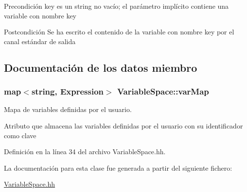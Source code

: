\begin{DoxyPrecond}{Precondición}
\textquotesingle{}key\textquotesingle{} es un string no vacío; el parámetro implícito contiene una variable con nombre \textquotesingle{}key\textquotesingle{} 
\end{DoxyPrecond}
\begin{DoxyPostcond}{Postcondición}
Se ha escrito el contenido de la variable con nombre \textquotesingle{}key\textquotesingle{} por el canal estándar de salida 
\end{DoxyPostcond}


\subsection{Documentación de los datos miembro}
\subsubsection[{\texorpdfstring{var\+Map}{varMap}}]{\setlength{\rightskip}{0pt plus 5cm}map$<$string, {\bf Expression}$>$ Variable\+Space\+::var\+Map\hspace{0.3cm}{\ttfamily [private]}}\hypertarget{class_variable_space_a5af4ff4cfb476da8de2ffd88e511dd01}{}\label{class_variable_space_a5af4ff4cfb476da8de2ffd88e511dd01}


Mapa de variables definidas por el usuario. 

Atributo que almacena las variables definidas por el usuario con su identificador como clave 

Definición en la línea 34 del archivo Variable\+Space.\+hh.



La documentación para esta clase fue generada a partir del siguiente fichero\+:\begin{DoxyCompactItemize}
\item 
\hyperlink{_variable_space_8hh}{Variable\+Space.\+hh}\end{DoxyCompactItemize}

